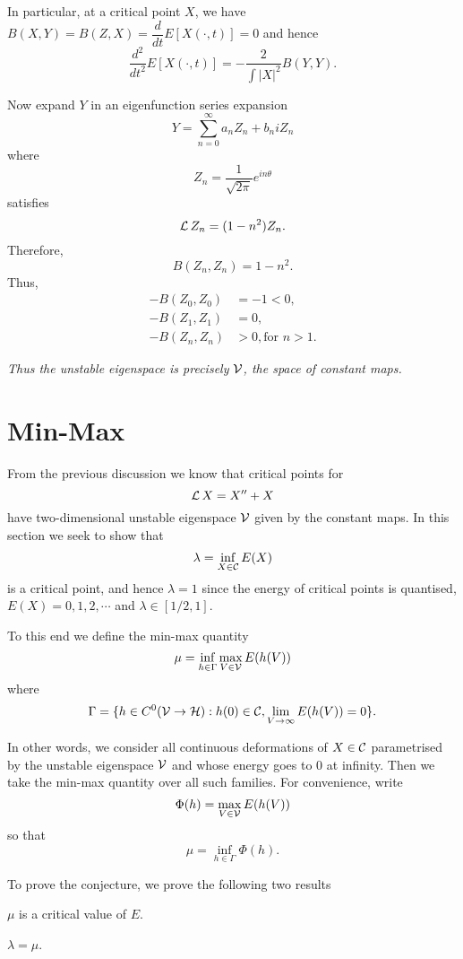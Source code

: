 \documentclass[12pt]{article}
\begin{document}
In particular, at a critical point \(X\), we have \(B(X, Y) = B(Z, X) = \dfrac{d}{dt}E[X(\cdot,t)] = 0\) and hence
\[
\dfrac{d^2}{dt^2}E[X(\cdot,t)] = -\frac2{\int|X|^2} B(Y, Y).
\]

Now expand \(Y\) in an eigenfunction series expansion
\[
Y = \sum_{n=0}^{\infty} a_n Z_n + b_n i Z_n
\]
where
\[
Z_n = \frac{1}{\sqrt{2\pi}} e^{in\theta}
\]
satisfies
\[
\operatorname{\mathcal{L}} Z_n = (1-n^2) Z_n.
\]
Therefore,
\[
B(Z_n, Z_n) = 1-n^2.
\]
Thus,
\begin{align*}
-B(Z_0, Z_0) &= -1 < 0, \\
-B(Z_1, Z_1) &= 0, \\
-B(Z_n, Z_n) &> 0, \text{for } n > 1.
\end{align*}

\emph{Thus the unstable eigenspace is precisely \(\operatorname{\mathcal{V}}\), the space of constant maps.}

\section{Min-Max}

From the previous discussion we know that critical points for
\[
\operatorname{\mathcal{L}} X = X'' + X
\]
have two-dimensional unstable eigenspace \(\operatorname{\mathcal{V}}\) given by the constant maps. In this section we seek to show that
\[
\lambda = \inf_{X \in \operatorname{\mathcal{C}}} E(X)
\]
is a critical point, and hence \(\lambda = 1\) since the energy of critical points is quantised, \(E(X) = 0, 1, 2, \cdots\) and \(\lambda \in [1/2, 1]\).

To this end we define the min-max quantity
\[
\mu = \inf_{h \in \Gamma} \max_{V \in \operatorname{\mathcal{V}}} E(h(V))
\]
where
\[
\Gamma = \{h \in C^0(\operatorname{\mathcal{V}} \to \operatorname{\mathcal{H}}) : h(0) \in \operatorname{\mathcal{C}}, \lim_{V\to\infty} E(h(V)) = 0\}.
\]

In other words, we consider all continuous deformations of \(X \in \operatorname{\mathcal{C}}\) parametrised by the unstable eigenspace \(\operatorname{\mathcal{V}}\) and whose energy goes to \(0\) at infinity. Then we take the min-max quantity over all such families. For convenience, write
\[
\Phi(h) = \max_{V \in \operatorname{\mathcal{V}}} E(h(V))
\]
so that
\[
\mu = \inf_{h \in \Gamma} \Phi(h).
\]

To prove the conjecture, we prove the following two results
\begin{thm}
\label{thm:critical}
\(\mu\) is a critical value of \(E\).
\end{thm}

\begin{lem}
\label{lem:lambda_eq_mu}
\(\lambda = \mu\).
\end{lem}
\end{document}
